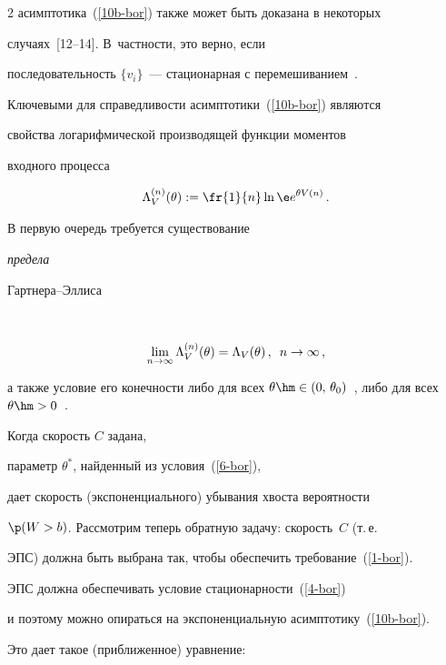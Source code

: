 \begin{multicols}{2}
 асимптотика~(\ref{10b-bor}) также  может быть доказана в некоторых 

 случаях~[12--14]. В~частности, это верно, если

последовательность $\{v_i\}$~---  стационарная с перемешиванием~\cite{Lewis}.



Ключевыми для справедливости  асимптотики~(\ref{10b-bor}) являются

свойства   логарифмической производящей функции моментов {\it

входного процесса}

\begin{equation*}

%

\Lambda_V^{(n)}(\theta):=\fr{1}{n} \ln \e e ^{\theta V(n)}\,.


\end{equation*}

В первую очередь требуется   существование   {\it предела

Гарт\-не\-ра--Эл\-лиса}~\cite {Glynn, Chang}

\begin{equation*}

\lim\limits_{n\to \infty} \Lambda_V^{(n)}(\theta)=\Lambda _V

(\theta)\,,\enskip n\to \infty\,, %

\end{equation*}

а также  условие  его конечности либо для всех $\theta\hm\in

(0,\,\theta_0)$~\cite{Ganesh, Glynn}, либо для всех $\theta\hm>0$~\cite{Chang}.



Когда скорость   $C$  задана,

 параметр $\theta^*$, найденный из условия~(\ref{6-bor}),

дает  скорость (экспоненциального) убывания хвоста вероятности

$\p(W>b)$. Рассмотрим теперь обратную задачу: скорость~$C$ (т.\,е.\

ЭПС) должна быть выбрана так, чтобы   обеспечить  требование~(\ref{1-bor}). 

ЭПС должна обеспечивать  условие стационарности~(\ref{4-bor})

и поэтому можно опираться на экспоненциальную асимптотику~(\ref{10b-bor}). 

Это дает такое (приближенное) уравнение:


\end{multicols}
